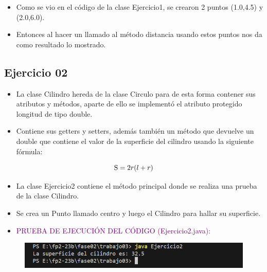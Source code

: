 \documentclass{article}
\begin{document}
    \begin{itemize}
        \item Como se vio en el código de la clase Ejercicio1, se crearon 2 puntos (1.0,4.5) y (2.0,6.0).
        \item Entonces al hacer un llamado al método distancia usando estos puntos nos da como resultado lo mostrado.
    \end{itemize}

\newpage
    
\subsection{Ejercicio 02}


    \begin{itemize}
        \item La clase Cilindro hereda de la clase Circulo para de esta forma contener sus atributos y métodos, aparte de ello se implementó el atributo protegido longitud de tipo double.
        \item Contiene sus getters y setters, además también un método que devuelve un double que contiene el valor de la superficie del cilindro usando la siguiente fórmula:
    \end{itemize}
    \[
    \text S = 2r(l + r)
    \]
    


    \begin{itemize}
        \item La clase Ejercicio2 contiene el método principal donde se realiza una prueba de la clase Cilindro.
        \item Se crea un Punto llamado centro y luego el Cilindro para hallar su superficie.
    \end{itemize}
    


    \begin{itemize}
        \item \textcolor{purple}{PRUEBA DE EJECUCIÓN DEL CÓDIGO (Ejercicio2.java):}
    \end{itemize}
    \begin{figure}[H]
        \centering
        \includegraphics[width=1
        \textwidth,keepaspectratio]{img/Ejercicio2_prueba.png}
    \end{figure}
\end{document}
